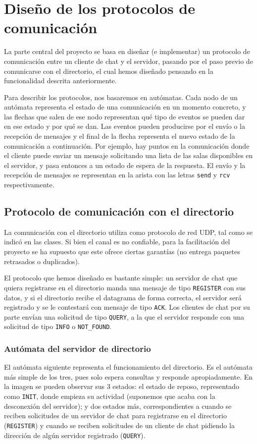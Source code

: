 \section{Diseño de los protocolos de comunicación}
La parte central del proyecto se basa en diseñar (e implementar) un protocolo de comunicación entre un cliente de chat y el servidor, pasando por el paso previo de comunicarse con el directorio, el cual hemos diseñado pensando en la funcionalidad descrita anteriormente.

Para describir los protocolos, nos basaremos en autómatas. Cada nodo de un autómata representa el estado de una comunicación en un momento concreto, y las flechas que salen de ese nodo representan qué tipo de eventos se pueden dar en ese estado y por qué se dan. Las eventos pueden producirse por el envío o la recepción de mensajes y el final de la flecha representa el nuevo estado de la comunicación a continuación. Por ejemplo, hay puntos en la comunicación donde el cliente puede enviar un mensaje solicitando una lista de las salas disponibles en el servidor, y pasa entonces a un estado de espera de la respuesta. El envío y la recepción de mensajes se representan en la arista con las letras \lstinline!send! y \lstinline!rcv! respectivamente.

\subsection{Protocolo de comunicación con el directorio}
La comunicación con el directorio utiliza como protocolo de red UDP, tal como se indicó en las clases. Si bien el canal es no confiable, para la facilitación del proyecto se ha supuesto que este ofrece ciertas garantías (no entrega paquetes retrasados o duplicados).

El protocolo que hemos diseñado es bastante simple: un servidor de chat que quiera registrarse en el directorio manda una mensaje de tipo \lstinline!REGISTER! con sus datos, y si el directorio recibe el datagrama de forma correcta, el servidor será registrado y se le contestará con mensaje de tipo \lstinline!ACK!. Los clientes de chat por su parte envían una solicitud de tipo \lstinline!QUERY!, a la que el servidor responde con una solicitud de tipo \lstinline!INFO! o \lstinline!NOT_FOUND!.

\subsubsection{Autómata del servidor de directorio}
El autómata siguiente representa el funcionamiento del directorio. Es el autómata más simple de los tres, pues solo espera consultas y responde apropiadamente. En la imagen se pueden observar sus 3 estados: el estado de reposo, representado como \lstinline{INIT}, donde empieza su actividad (suponemos que acaba con la desconexión del servidor); y dos estados más, correspondientes a cuando se reciben solicitudes de un servidor de chat para registrarse en el directorio (\lstinline{REGISTER}) y cuando se reciben solicitudes de un cliente de chat pidiendo la dirección de algún servidor registrado (\lstinline{QUERY}).

